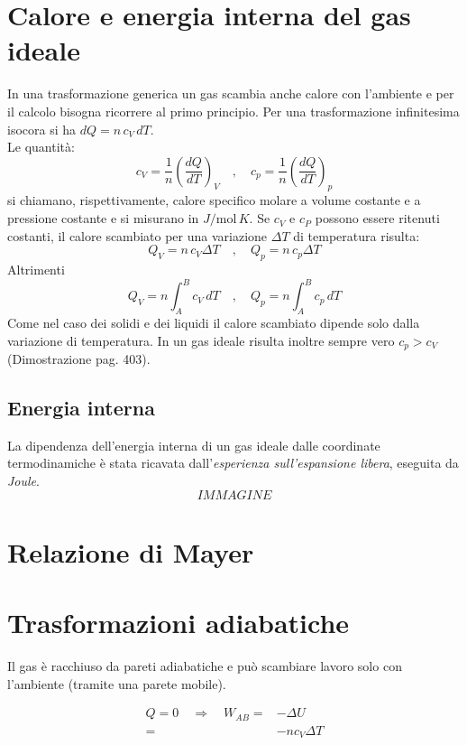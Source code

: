 \documentclass[x11names]{report}
\begin{document}
	\section{Calore e energia interna del gas ideale}
	In una trasformazione generica un gas scambia anche calore con l'ambiente e per il calcolo bisogna ricorrere al primo principio. Per una trasformazione infinitesima isocora si ha $dQ = n\,c_V\,dT$. \\Le quantità:
	\[ 
	c_V = \frac{1}{n}\left(\frac{dQ}{dT}\right)_V \quad,\quad c_p = \frac{1}{n}\left(\frac{dQ}{dT}\right)_p
	\]
	si chiamano, rispettivamente, calore specifico molare a volume costante e a pressione costante e si misurano in $J/\text{mol}\,K$. 
	Se $c_V$ e $c_P$ possono essere ritenuti costanti, il calore scambiato per una variazione $\Delta T$ di temperatura risulta: 
	\begin{equation} 
		Q_V = n\,c_V\Delta T \quad,\quad Q_p = n\,c_p\Delta T
	\end{equation}
	Altrimenti
	\begin{equation} 
		Q_V = n\int_{A}^{B} c_V\,dT \quad,\quad Q_p = n\int_{A}^{B} c_p\,dT
	\end{equation}
	Come nel caso dei solidi e dei liquidi il calore scambiato dipende solo dalla variazione di temperatura. In un gas ideale risulta inoltre sempre vero $c_p > c_V$ (Dimostrazione pag. 403). 
	
	\subsection{Energia interna}
	La dipendenza dell'energia interna di un gas ideale dalle coordinate termodinamiche è stata ricavata dall'\textit{esperienza sull'espansione libera}, eseguita da \textit{Joule}.
	\[ IMMAGINE \]
	
	
	 
	\section{Relazione di Mayer}
	
	\section{Trasformazioni adiabatiche}
	Il gas è racchiuso da pareti adiabatiche e può scambiare lavoro solo con l'ambiente (tramite una parete mobile).
	 
	\begin{align*}
		Q = 0 \quad \Rightarrow \quad W_{AB} =& -\Delta U \\
											 =& -nc_{V} \Delta T
	\end{align*}
	
\end{document}
